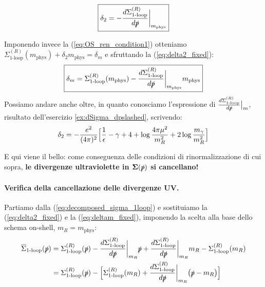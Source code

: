 \documentclass[../main.tex]{subfiles}
\begin{document}
\begin{equation}
    \boxed{\delta_2 = -\frac{d\Sigma_\text{1-loop}^{(R)}}{d\slashed p}\bigg|_{ m_\text{phys}}}
    \label{eq:delta2_fixed}
\end{equation}

Imponendo invece la (\ref{eq:OS_ren_condition1}) otteniamo \(\Sigma_\text{1-loop}^{(R)}(m_\text{phys}) + \delta_2 m_\text{phys} = \delta_m\) e sfruttando la (\ref{eq:delta2_fixed}):
 \begin{equation}
 \boxed{
     \delta_m = \Sigma_\text{1-loop}^{(R)}(m_\text{phys}) - \frac{d\Sigma_\text{1-loop}^{(R)}}{d\slashed p}\bigg|_{m_\text{phys}} m_\text{phys} }
     \label{eq:deltam_fixed}
 \end{equation}
 Possiamo andare anche oltre, in quanto conosciamo l'espressione di $\frac{d\Sigma_\text{1-loop}^{(R)}}{d\slashed p}\big|_{m}$, risultato dell'esercizio \ref{ex:dSigma_dpslashed}, scrivendo:
 \begin{equation}
     \delta_2 = -\frac{e^2}{(4\pi)^2}\Bigl[\frac{1}{\epsilon} - \mathbb \gamma + 4 + \log{\frac{4\pi\mu^2}{m_R^2}} +2\log{\frac{m_\gamma}{m_R^2}} \Bigr]
     \label{eq:delta2_explicit}
 \end{equation}

 E qui viene il bello: come conseguenza delle condizioni di rinormalizzazione di cui sopra, \textbf{le divergenze ultraviolette in $\mathbf{\Sigma(\slashed p)}$ si cancellano!}

 \paragraph{Verifica della cancellazione delle divergenze UV.}
 Partiamo dalla (\ref{eq:decomposed_sigma_1loop}) e sostituiamo la (\ref{eq:delta2_fixed}) e la (\ref{eq:deltam_fixed}), imponendo la scelta alla base dello schema on-shell, $m_R=m_\text{phys}$:
 \begin{align*}
     \overline\Sigma_\text{1-loop}(\slashed p) &= \Sigma_\text{1-loop}^{(R)}(\slashed p)  -\frac{d\Sigma_\text{1-loop}^{(R)}}{d\slashed p}\bigg|_{ m_R}\slashed p  + \frac{d\Sigma_\text{1-loop}^{(R)}}{d\slashed p}\bigg|_{m_R} m_R - \Sigma_\text{1-loop}^{(R)}(m_R)\\
     & = \Sigma_\text{1-loop}^{(R)}(\slashed p)  - \Bigl[\Sigma_\text{1-loop}^{(R)}(m_R)+\frac{d\Sigma_\text{1-loop}^{(R)}}{d\slashed p}\bigg|_{ m_R} \bigl(\slashed p - m_R\bigr) \Bigr]\\
 \end{align*}
\end{document}
